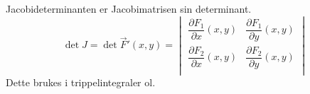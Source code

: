 Jacobideterminanten er Jacobimatrisen sin determinant.
$$\det J = \det \vec{F}'(x,y)
         = \begin{vmatrix}
           \dfrac{\partial F_1}{\partial x}(x,y)
             & \dfrac{\partial F_1}{\partial y}(x,y) \\[8pt]
           \dfrac{\partial F_2}{\partial x}(x,y)
             & \dfrac{\partial F_2}{\partial y}(x,y) \\[8pt]
           \end{vmatrix}$$
Dette brukes i trippelintegraler ol.
